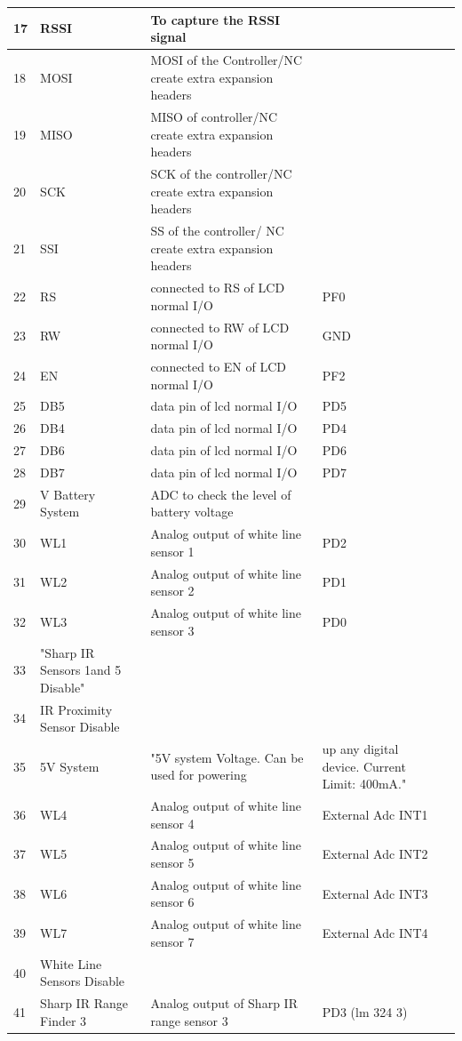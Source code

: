 \documentclass[a4paper,10pt,oneside]{article}
\begin{document}
{\begin{longtable}{|p{}|p{}|p{}|p{}|p{}|}
				17&	RSSI&	To capture the RSSI signal&\\ \hline	
				18&	MOSI&	MOSI of the Controller/NC create extra expansion headers&\\ \hline	
				19&	MISO&	MISO of controller/NC create extra expansion headers	&\\ \hline
				20&	SCK&	SCK of the controller/NC create extra expansion headers&	\\ \hline
				21&	SSI	&SS of the controller/ NC create extra expansion headers	&\\ \hline
				22&	RS&	connected to RS of LCD normal I/O&	PF0\\ \hline
				23&	RW&	connected to RW of LCD normal I/O&	GND\\ \hline
				24&	EN&	connected to EN of LCD normal I/O&	PF2\\ \hline
				25&	DB5	&data pin of lcd normal I/O	&PD5\\ \hline
				26&	DB4&	data pin of lcd normal I/O&	PD4\\ \hline
				27&	DB6	&data pin of lcd normal I/O	&PD6\\ \hline
				28&	DB7	&data pin of lcd normal I/O	&PD7\\ \hline
				29&	V Battery System&	ADC to check the level of battery voltage	&\\ \hline
				30&	WL1&	Analog output of white line sensor 1	&PD2\\ \hline
				31&	WL2&	Analog output of white line sensor 2&	PD1\\ \hline
				32&	WL3&	Analog output of white line sensor 3&	PD0\\ \hline
				33&	"Sharp IR Sensors 1and 5
				Disable"& &		\\ \hline
				34&	IR Proximity Sensor Disable& &	\\ \hline	
				35&	5V System&	"5V system Voltage. Can be used for powering&
				up any digital device. Current Limit: 400mA."\\ \hline
				36&	WL4&	Analog output of white line sensor 4&	External Adc INT1\\ \hline
				37&	WL5&	Analog output of white line sensor 5&	External Adc INT2\\ \hline
				38&	WL6&	Analog output of white line sensor 6	&External Adc INT3\\ \hline
				39&	WL7&	Analog output of white line sensor 7&	External Adc INT4\\ \hline
				40&	White Line Sensors Disable&&\\ \hline		
				41&	Sharp IR Range Finder 3&	Analog output of Sharp IR range sensor 3	&PD3 (lm 324 3)\\ \hline

\end{longtable}}
\end{document}
